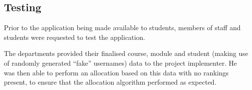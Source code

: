 
\subsection{Testing}




Prior to the application being made available to students, members of staff
and students were requested to test the application.


The departments provided their finalised course, module and student (making
use of randomly generated ``fake'' usernames) data to the project implementer.
He was then able to perform an allocation based on this data with no rankings
present, to ensure that the allocation algorithm performed as expected.

